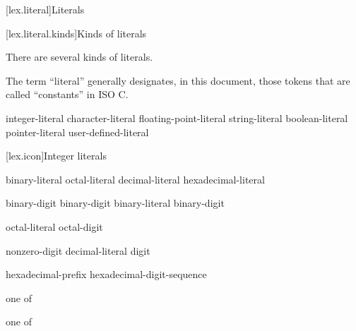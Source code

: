 [lex.literal]{Literals}%

[lex.literal.kinds]{Kinds of literals}

\pnum
{}%
%
There are several kinds of literals.
\begin{footnote}
The term ``literal'' generally designates, in this
document, those tokens that are called ``constants'' in
ISO C.
\end{footnote}

\begin{bnf}
\br
    integer-literal\br
    character-literal\br
    floating-point-literal\br
    string-literal\br
    boolean-literal\br
    pointer-literal\br
    user-defined-literal
\end{bnf}

[lex.icon]{Integer literals}

%
\begin{bnf}
\br
    binary-literal \br
    octal-literal \br
    decimal-literal \br
    hexadecimal-literal 
\end{bnf}

\begin{bnf}
\br
     binary-digit\br
     binary-digit\br
    binary-literal  binary-digit
\end{bnf}

\begin{bnf}
\br
    \br
    octal-literal  octal-digit
\end{bnf}

\begin{bnf}
\br
    nonzero-digit\br
    decimal-literal  digit
\end{bnf}

\begin{bnf}
\br
    hexadecimal-prefix hexadecimal-digit-sequence
\end{bnf}

\begin{bnf}
 \textnormal{one of}\br
\end{bnf}

\begin{bnf}
 \textnormal{one of}\br
\end{bnf}

